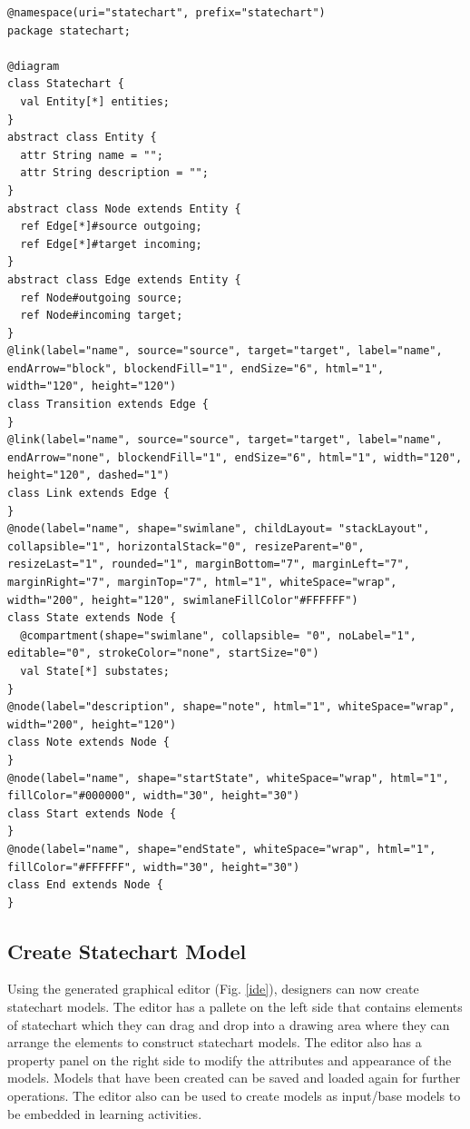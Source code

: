 \documentclass[conference]{IEEEtran}
\begin{document}
\begin{lstlisting}[style=interfaces,caption={A definition of Start State derived from Node class using Emfatic and Eugenia-like annotations.},label=metamodel]
@namespace(uri="statechart", prefix="statechart")
package statechart;

@diagram
class Statechart {
  val Entity[*] entities;
}
abstract class Entity {
  attr String name = "";
  attr String description = "";
}
abstract class Node extends Entity {
  ref Edge[*]#source outgoing;
  ref Edge[*]#target incoming;
}
abstract class Edge extends Entity {
  ref Node#outgoing source;
  ref Node#incoming target;
}
@link(label="name", source="source", target="target", label="name", endArrow="block", blockendFill="1", endSize="6", html="1", width="120", height="120")
class Transition extends Edge {
}
@link(label="name", source="source", target="target", label="name", endArrow="none", blockendFill="1", endSize="6", html="1", width="120", height="120", dashed="1")
class Link extends Edge {
}
@node(label="name", shape="swimlane", childLayout= "stackLayout", collapsible="1", horizontalStack="0", resizeParent="0", resizeLast="1", rounded="1", marginBottom="7", marginLeft="7", marginRight="7", marginTop="7", html="1", whiteSpace="wrap", width="200", height="120", swimlaneFillColor"#FFFFFF")
class State extends Node {
  @compartment(shape="swimlane", collapsible= "0", noLabel="1", editable="0", strokeColor="none", startSize="0")
  val State[*] substates;
}
@node(label="description", shape="note", html="1", whiteSpace="wrap", width="200", height="120")
class Note extends Node {
}
@node(label="name", shape="startState", whiteSpace="wrap", html="1", fillColor="#000000", width="30", height="30")
class Start extends Node {
}
@node(label="name", shape="endState", whiteSpace="wrap", html="1", fillColor="#FFFFFF", width="30", height="30")
class End extends Node {
}
\end{lstlisting} 

\subsection{Create Statechart Model}
Using the generated graphical editor (Fig. \ref{ide}), designers can now create statechart models. The editor has a pallete on the left side that contains elements of statechart which they can drag and drop into a drawing area where they can arrange the elements to construct statechart models. The editor also has a property panel on the right side to modify the attributes and appearance of the models. Models that have been created can be saved and loaded again for further operations. The editor also can be used to create models as input/base models to be embedded in learning activities.        
\end{document}
